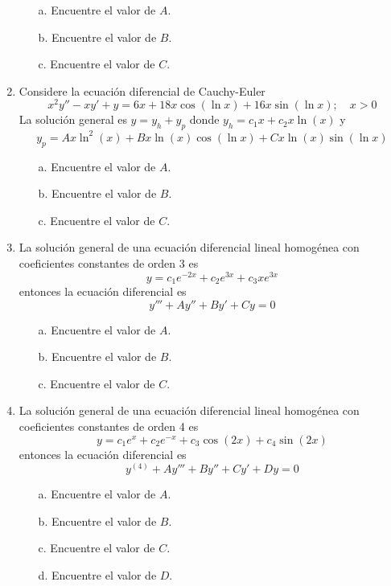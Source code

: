 \begin{enumerate}
\begin{itemize}
    \item[a.] Encuentre el valor de $A$.
    \item[b.] Encuentre el valor de $B$.
    \item[c.] Encuentre el valor de $C$.
\end{itemize}

\item  Considere la ecuación diferencial de Cauchy-Euler
$$x^2y'' - xy' + y = 6x + 18x\cos(\ln x) + 16x\sin(\ln x); \quad x > 0$$
La solución general es $y = y_h + y_p$ donde $y_h = c_1x + c_2x\ln(x)$ y
$$y_p = Ax\ln^2(x) + Bx\ln(x)\cos(\ln x) + Cx\ln(x)\sin(\ln x)$$


\begin{itemize}
    \item[a.] Encuentre el valor de $A$.
    \item[b.] Encuentre el valor de $B$.
    \item[c.] Encuentre el valor de $C$.
\end{itemize}

\item La solución general de una ecuación diferencial lineal homogénea con coeficientes constantes de orden 3 es
$$y = c_1e^{-2x} + c_2e^{3x} + c_3xe^{3x}$$
entonces la ecuación diferencial es
$$y''' + Ay'' + By' + Cy = 0$$

\begin{itemize}
    \item[a.] Encuentre el valor de $A$.
    \item[b.] Encuentre el valor de $B$.
    \item[c.] Encuentre el valor de $C$.
\end{itemize}

\item La solución general de una ecuación diferencial lineal homogénea con coeficientes constantes de orden 4 es
$$y = c_1e^{x} + c_2e^{-x} + c_3\cos(2x) + c_4\sin(2x)$$
entonces la ecuación diferencial es
$$y^{(4)} + Ay''' + By'' + Cy' + Dy = 0$$

\begin{itemize}
    \item[a.] Encuentre el valor de $A$.
    \item[b.] Encuentre el valor de $B$.
    \item[c.] Encuentre el valor de $C$.
    \item[d.] Encuentre el valor de $D$.
\end{itemize}


\end{enumerate}
